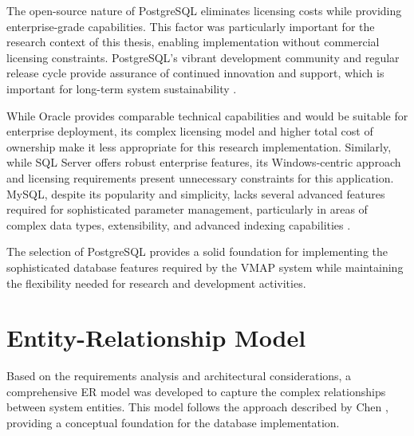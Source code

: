 The open-source nature of PostgreSQL eliminates licensing costs while providing enterprise-grade capabilities. This factor was particularly important for the research context of this thesis, enabling implementation without commercial licensing constraints. PostgreSQL's vibrant development community and regular release cycle provide assurance of continued innovation and support, which is important for long-term system sustainability \cite{obe2017postgresql}.

While Oracle provides comparable technical capabilities and would be suitable for enterprise deployment, its complex licensing model and higher total cost of ownership make it less appropriate for this research implementation. Similarly, while SQL Server offers robust enterprise features, its Windows-centric approach and licensing requirements present unnecessary constraints for this application. MySQL, despite its popularity and simplicity, lacks several advanced features required for sophisticated parameter management, particularly in areas of complex data types, extensibility, and advanced indexing capabilities \cite{williams2004web}.

The selection of PostgreSQL provides a solid foundation for implementing the sophisticated database features required by the \ac{VMAP} system while maintaining the flexibility needed for research and development activities.

\section{Entity-Relationship Model}
\label{sec:entity-relationship-model}

Based on the requirements analysis and architectural considerations, a comprehensive \ac{ER} model was developed to capture the complex relationships between system entities. This model follows the approach described by Chen \cite{chen1976entity}, providing a conceptual foundation for the database implementation.

